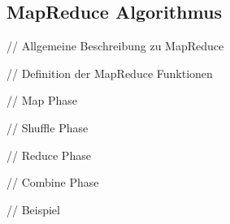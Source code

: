 \subsection{MapReduce Algorithmus}
// Allgemeine Beschreibung zu MapReduce

// Definition der MapReduce Funktionen

// Map Phase

// Shuffle Phase

// Reduce Phase

// Combine Phase

// Beispiel